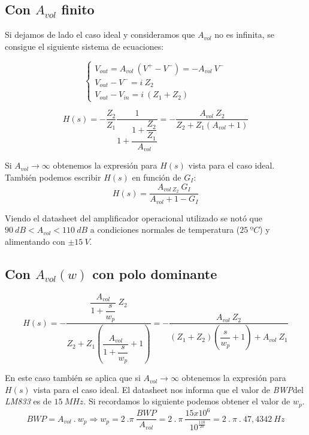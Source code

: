 \documentclass[11pt, a4paper]{article}
\begin{document}
\subsection{Con $A_{vol}$ finito}
Si dejamos de lado el caso ideal y consideramos que $A_{vol}$ no es infinita, se consigue el siguiente sistema de ecuaciones:

\begin{equation}
\begin{cases}
V_{out} = A_{vol} \ (V^+ - V^-) = - A_{vol} \ V^- \\ V_{out} - V^- = i \ Z_2 \\ V_{out} - V_{in} = i \ (Z_1+Z_2) 
\end{cases} 
\end{equation}

\begin{equation}
H(s) = - \dfrac{Z_2}{Z_1} \dfrac{1}{1+\dfrac{1+\dfrac{Z_2}{Z_1}}{A_{vol}}}
= -
\dfrac{A_{vol} \ Z_2}{Z_2 + Z_1 (A_{vol} +1)}
\end{equation}

Si $A_{vol} \longrightarrow \infty$ obtenemos la expresión para $H(s)$ vista para el caso ideal.
También podemos escribir $H(s)$ en función de $G_I$:
\begin{equation}
H(s) = \dfrac{A_{vol \ Z_2} \ G_I}{A_{vol} + 1 - G_I} 
\end{equation}

Viendo el datasheet del amplificador operacional utilizado se notó que $90 \ dB< A_{vol} < 110 \ dB$ a condiciones normales de temperatura ($25 \ ºC$) y alimentando con $\pm 15 \ V$.

\subsection{Con $A_{vol}(w)$ con polo dominante}
\begin{equation}
H(s) = - \dfrac{\dfrac{A_{vol}}{1+\dfrac{s}{w_p}} \ Z_2}{Z_2 + Z_1 \left(\dfrac{A_{vol}}{1+\dfrac{s}{w_p}} +1 \right)} 
=
-\dfrac{A_{vol} \ Z_2}{(Z_1+Z_2) \left(\dfrac{s}{w_p}+1 \right)+ A_{vol} \ Z_1}
\end{equation}


En este caso también se aplica que si $A_{vol} \longrightarrow \infty$ obtenemos la expresión para $H(s)$ vista para el caso ideal.
El datasheet nos informa que el valor de \textit{BWP}del \textit{LM833} es de $15 \ MHz$.
Si recordamos lo siguiente podemos obtener el valor de $w_p$.
\begin{equation}
BWP = A_{vol} \ . \ w_p \Rightarrow w_p= 2 \ . \pi \ \frac{BWP}{A_{vol}}= 2 \ . \ \pi \ \frac{15x10^6}{10^{\frac{110}{20}}} = 2 \ . \ \pi \ . \ 47,4342 \ Hz
\end{equation}
\end{document}

